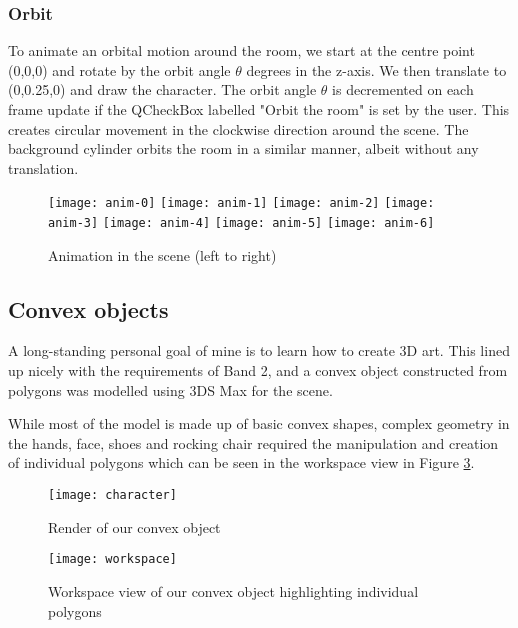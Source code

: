 \documentclass{article}
\begin{document}
			
			\subsubsection{Orbit}
			To animate an orbital motion around the room, we start at the centre point (0,0,0) and rotate by
			the orbit angle $\theta$ degrees in the z-axis. We then translate to (0,0.25,0) and draw the
			character.
			The orbit angle $\theta$ is decremented on each frame update if the QCheckBox 
			labelled "Orbit the room" is set by the user. This creates circular movement in
			the clockwise direction around the scene. The background cylinder orbits the room in a similar manner,
			albeit without any translation.

			\bigskip

			\begin{figure}[H]
				\centering	
				\texttt{[image: anim-0]}
				\texttt{[image: anim-1]}
				\texttt{[image: anim-2]}
				\texttt{[image: anim-3]}
				\texttt{[image: anim-4]}
				\texttt{[image: anim-5]}
				\texttt{[image: anim-6]}
				\caption{Animation in the scene (left to right)}
				\label{anim-reel}
			\end{figure}

		\subsection{Convex objects}\label{convex-object}
		A long-standing personal goal of mine is to learn how to create 3D art.
		This lined up nicely with the requirements of Band 2, and a convex object constructed from
		polygons was modelled using 3DS Max for the scene.
		
		\bigskip
		
		While most of the model is made up of basic convex shapes, complex geometry in the hands, face, shoes and
		rocking chair required the manipulation and creation of individual polygons which can be seen in the workspace view
		in Figure \ref{workspace}.
		
		\begin{figure}[htbp]
			\centering	
			\texttt{[image: character]}
			\caption{Render of our convex object}
			\label{character}
		\end{figure}
		\begin{figure}[htbp]
			\centering	
			\texttt{[image: workspace]}
			\caption{Workspace view of our convex object highlighting individual polygons}
			\label{workspace}
		\end{figure}
\end{document}
